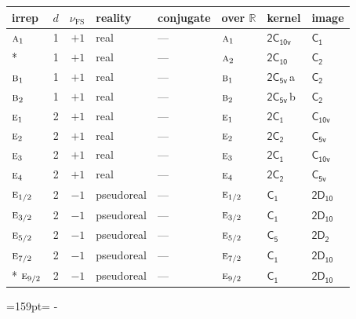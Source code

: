 \documentclass[10pt,a4paper]{article}
\makeatletter
\def\grouprule#1#2{\noalign{\marks\LTgroupmarks{\the\belowrulesep}\nobreak\vskip#1%
  \vskip\aboverulesep}\multispan\LT@cols\unskip{\leaders\hrule\@height#2\hfill\kern\z@}\cr
  \noalign{\penalty\LTrulebreak\vskip\belowrulesep\global\@lastruleclass\z@}}
\newcommand{\needspace}[1]{\par\penalty-100\begingroup\dimen0=#1\relax\dimen2=\pagegoal
  \advance\dimen2-\pagetotal\ifdim\dimen0>\dimen2\relax\ifdim\dimen2>0pt\vfil\break\fi\fi
  \endgroup}
\numberwithin{equation}{section}
\newcommand{\grp}[1]{\mathsf{#1}}
\newcommand{\irr}[1]{\text{\normalfont\scshape #1}}
\newcommand{\detbox}[1]{{\setlength{\fboxsep}{1pt}\fbox{#1}}}
\newcommand{\clsletter}[1]{\,{\scriptsize\color{black!55}#1}}
\newcommand{\fsind}{\nu_{\mathrm{FS}}}
\makeatother
\begin{document}
\setlength{\emergencystretch}{2em}\par\setlength{\emergencystretch}{0pt}
{\small\renewcommand{\arraystretch}{1.25}\setlength{\tabcolsep}{4pt}\begin{longtable}{@{}lrrlllll@{}}\toprule
irrep & $d$ & $\fsind$ & reality & conjugate & over $\mathbb{R}$ & kernel & image\\\midrule\endhead
\bottomrule\endfoot\endlastfoot
$\irr{a}_{1}$ & 1 & $+1$ & real & --- & $\irr{a}_{1}$ & \href{2C10v.pdf}{$\grp{2C_{10v}}$} & \href{../../../rotation/data/pdf/C1.pdf}{$\grp{C_{1}}$}\\*
\detbox{$\irr{a}_{2}$} & 1 & $+1$ & real & --- & $\irr{a}_{2}$ & \href{2C10.pdf}{$\grp{2C_{10}}$} & \href{../../../rotation/data/pdf/C2.pdf}{$\grp{C_{2}}$}\\
$\irr{b}_{1}$ & 1 & $+1$ & real & --- & $\irr{b}_{1}$ & \href{2C5v.pdf}{$\grp{2C_{5v}}$}\clsletter{a} & \href{../../../rotation/data/pdf/C2.pdf}{$\grp{C_{2}}$}\\
$\irr{b}_{2}$ & 1 & $+1$ & real & --- & $\irr{b}_{2}$ & \href{2C5v.pdf}{$\grp{2C_{5v}}$}\clsletter{b} & \href{../../../rotation/data/pdf/C2.pdf}{$\grp{C_{2}}$}\\
$\irr{e}_{1}$ & 2 & $+1$ & real & --- & $\irr{e}_{1}$ & \href{2C1.pdf}{$\grp{2C_{1}}$} & \href{../../../rotation/data/pdf/C10v.pdf}{$\grp{C_{10v}}$}\\
$\irr{e}_{2}$ & 2 & $+1$ & real & --- & $\irr{e}_{2}$ & \href{2C2.pdf}{$\grp{2C_{2}}$} & \href{../../../rotation/data/pdf/C5v.pdf}{$\grp{C_{5v}}$}\\
$\irr{e}_{3}$ & 2 & $+1$ & real & --- & $\irr{e}_{3}$ & \href{2C1.pdf}{$\grp{2C_{1}}$} & \href{../../../rotation/data/pdf/C10v.pdf}{$\grp{C_{10v}}$}\\
$\irr{e}_{4}$ & 2 & $+1$ & real & --- & $\irr{e}_{4}$ & \href{2C2.pdf}{$\grp{2C_{2}}$} & \href{../../../rotation/data/pdf/C5v.pdf}{$\grp{C_{5v}}$}\\
\grouprule{0pt}{\lightrulewidth}
$\irr{e}_{1/2}$ & 2 & $-1$ & pseudoreal & --- & $\irr{e}_{1/2}$ & \href{C1.pdf}{$\grp{C_{1}}$} & \href{2D10.pdf}{$\grp{2D_{10}}$}\\
$\irr{e}_{3/2}$ & 2 & $-1$ & pseudoreal & --- & $\irr{e}_{3/2}$ & \href{C1.pdf}{$\grp{C_{1}}$} & \href{2D10.pdf}{$\grp{2D_{10}}$}\\
$\irr{e}_{5/2}$ & 2 & $-1$ & pseudoreal & --- & $\irr{e}_{5/2}$ & \href{C5.pdf}{$\grp{C_{5}}$} & \href{2D2.pdf}{$\grp{2D_{2}}$}\\
$\irr{e}_{7/2}$ & 2 & $-1$ & pseudoreal & --- & $\irr{e}_{7/2}$ & \href{C1.pdf}{$\grp{C_{1}}$} & \href{2D10.pdf}{$\grp{2D_{10}}$}\\*
$\irr{e}_{9/2}$ & 2 & $-1$ & pseudoreal & --- & $\irr{e}_{9/2}$ & \href{C1.pdf}{$\grp{C_{1}}$} & \href{2D10.pdf}{$\grp{2D_{10}}$}\\
\bottomrule\end{longtable}}
\needspace{159pt}
\end{document}
